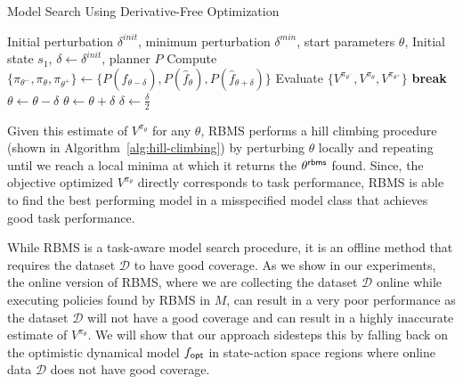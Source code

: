  \begin{algorithm}[t]
    \caption{Model Search Using Derivative-Free Optimization~\cite{DBLP:conf/icra/JosephGRHR13}}
    \begin{algorithmic}[1]
      \State Initial perturbation $\delta^{init}$,
        minimum perturbation $\delta^{min}$, start parameters $\theta$,
      Initial state $s_1$, $\delta \leftarrow \delta^{init}$, planner $P$
      \State Compute $\{\pi_{\theta^-}, \pi_\theta, \pi_{\theta^+}\}
      \leftarrow \{P(\hat{f}_{\theta - \delta}), P(\hat{f}_{\theta}),
      P(\hat{f}_{\theta + \delta})\}$
      \State Evaluate $\{V^{\pi_{\theta^-}}, V^{\pi_\theta},
      V^{\pi_{\theta^+}}\}$ \label{line:evaluation}
      \State \textbf{break}
      \EndIf
      \State $\theta \leftarrow \theta - \delta$
      \Else
      \State $\theta \leftarrow \theta + \delta$
      \EndIf
      \EndWhile
      \EndFor
      \State $\delta \leftarrow \frac{\delta}{2}$
      \EndWhile \\
      \Return{$\theta$}
      \EndProcedure
    \end{algorithmic}
    \label{alg:hill-climbing}
  \end{algorithm}

  Given this estimate of $V^{\pi_\theta}$ for any $\theta$, RBMS
  performs a hill climbing procedure (shown in
  Algorithm~\ref{alg:hill-climbing}) by perturbing $\theta$ locally 
  and repeating until we reach a local minima at which it returns the
  $\theta^{\mathsf{rbms}}$ found. Since, the objective optimized
  $V^{\pi_\theta}$ directly corresponds to task performance, RBMS is
  able to find the best performing model in a misspecified model class
  that achieves good task performance.

While RBMS is a task-aware model search procedure, it is an offline
method that requires the dataset $\mathcal{D}$ to have good
coverage. As we show in our experiments, the online version of RBMS,
where we are collecting the dataset $\mathcal{D}$ online while
executing policies found by RBMS in $M$, can result in a very poor
performance as the dataset $\mathcal{D}$ will not have a good coverage
and can result in a highly inaccurate estimate of $V^{\pi_\theta}$. We
will show that our approach \taml{} sidesteps this by falling back on
the optimistic dynamical model $f_\mathsf{opt}$ in state-action space regions
where online data $\mathcal{D}$ does not have good coverage.

